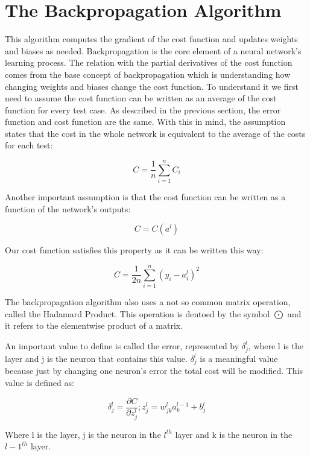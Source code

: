 \documentclass[a4paper, 12pts]{amsart}
\begin{document}
\section{The Backpropagation Algorithm}

This algorithm computes the gradient of the cost function and updates weights and biases as needed. Backpropagation is the core element of a neural network's learning process. The relation with the partial derivatives of the cost function comes from the base concept of backpropagation which is understanding how changing weights and biases change the cost function. To understand it we first need to assume the cost function can be written as an average of the cost function for every test case. As described in the previous section, the error function and cost function are the same. With this in mind, the assumption states that the cost in the whole network is equivalent to the average of the costs for each test:

\[C = \frac{1}{n}\sum_{i=1}^{n}C_i\]

Another important assumption is that the cost function can be written as a function of the network's outputs:

\[C = C(a^l)\]

Our cost function satisfies this property as it can be written this way:

\[C = \frac{1}{2n}\sum_{i=1}^{n} (y_i-a_i^l)^2\]

The backpropagation algorithm also uses a not so common matrix operation, called the Hadamard Product. This operation is dentoed by the symbol $\bigodot$ and it refers to the elementwise product of a matrix. 

An important value to define is called the error, represented by $\delta_j^l$, where l is the layer and j is the neuron that contains this value. $\delta_j^l$ is a meaningful value because just by changing one neuron's error the total cost will be modified. This value is defined as:

\[\delta_j^l = \frac{\partial C}{\partial z_j^l} ;  z^l_j = w_{jk}^la_k^{l-1}+b_j^l\]

Where l is the layer, j is the neuron in the $l^{th}$ layer and k is the neuron in the $l-1^{th}$ layer.
\end{document}
